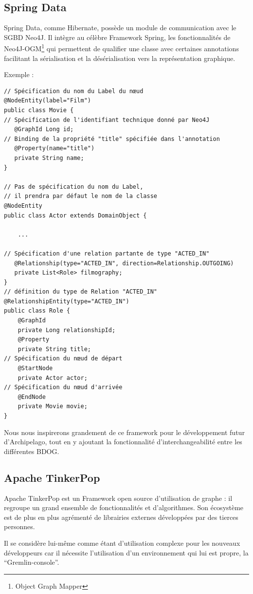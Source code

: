 \documentclass[a4paper,fleqn,12pt,oneside]{book}
\begin{document}
\subsection{Spring Data}

Spring Data, comme Hibernate, possède un module de communication avec le SGBD Neo4J. Il intègre au célèbre Framework Spring, les fonctionnalités de Neo4J-OGM\footnote{Object Graph Mapper} qui permettent de qualifier une classe avec certaines annotations facilitant la sérialisation et la désérialisation vers la représentation graphique.

Exemple : 

\begin{lstlisting}
// Spécification du nom du Label du nœud
@NodeEntity(label="Film")
public class Movie {
// Spécification de l'identifiant technique donné par Neo4J
   @GraphId Long id;
// Binding de la propriété "title" spécifiée dans l'annotation
   @Property(name="title")
   private String name;
}

// Pas de spécification du nom du Label, 
// il prendra par défaut le nom de la classe
@NodeEntity
public class Actor extends DomainObject {

	... 
	
// Spécification d'une relation partante de type "ACTED_IN"
   @Relationship(type="ACTED_IN", direction=Relationship.OUTGOING)
   private List<Role> filmography;
}
// définition du type de Relation "ACTED_IN" 
@RelationshipEntity(type="ACTED_IN")
public class Role {
    @GraphId   
    private Long relationshipId;
    @Property  
    private String title;
// Spécification du nœud de départ
    @StartNode 
    private Actor actor;
// Spécification du nœud d'arrivée
    @EndNode   
    private Movie movie;
}
\end{lstlisting}
Nous nous inspirerons grandement de ce framework pour le développement futur d'Archipelago, tout en y ajoutant la fonctionnalité d'interchangeabilité entre les différentes BDOG. 

\subsection{Apache TinkerPop}
\label{TinkerPop}
Apache TinkerPop est un Framework open source d’utilisation de graphe : il regroupe un grand ensemble de fonctionnalités et d’algorithmes. Son écosystème est de plus en plus agrémenté de librairies externes développées par des tierces personnes.

Il se considère lui-même comme étant d’utilisation complexe pour les nouveaux développeurs car il nécessite l’utilisation d’un environnement qui lui est propre, la \enquote{Gremlin-console}.
\end{document}
